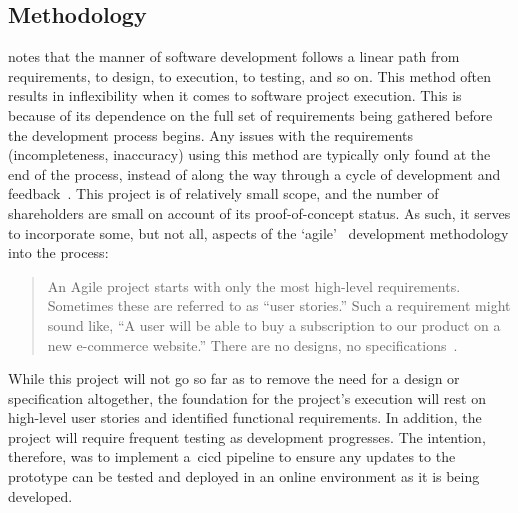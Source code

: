 \subsection{Methodology}\label{subsec:methodology}

\citet{murray-pm} notes that the  manner of software development follows a linear path from requirements, to design, to execution, to testing, and so on.
This method often results in inflexibility when it comes to software project execution.
This is because of its dependence on the full set of requirements being gathered before the development process begins.
Any issues with the requirements (incompleteness, inaccuracy) using this method are typically only found at the end of the process, instead of along the way through a cycle of development and feedback~\citep{murray-pm}.
This project is of relatively small scope, and the number of shareholders are small on account of its proof-of-concept status.
As such, it serves to incorporate some, but not all, aspects of the `\gls{agile}'~\citep{beck2001agile} development methodology into the process:

\begin{quotation}
    An Agile project starts with only the most high-level requirements.
    Sometimes these are referred to as “user stories.”
    Such a requirement might sound like, “A user will be able to buy a subscription to our product on a new e-commerce website.”
    There are no designs, no specifications~\citep{murray-pm}.
\end{quotation}

While this project will not go so far as to remove the need for a design or specification altogether, the foundation for the project’s execution will rest on high-level user stories and identified functional requirements.
In addition, the project will require frequent testing as development progresses.
The intention, therefore, was to implement a~\gls{cicd} pipeline to ensure any updates to the prototype can be tested and deployed in an online environment as it is being developed.
